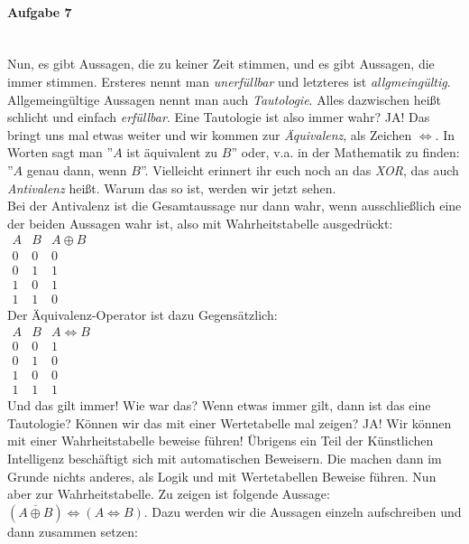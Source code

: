 \documentclass[12pt,a4paper,ngerman]{scrartcl}
\begin{document}
	\paragraph{Aufgabe 7}\mbox{}\\
	Nun, es gibt Aussagen, die zu keiner Zeit stimmen, und es gibt Aussagen, die immer stimmen. Ersteres nennt man \emph{unerfüllbar} und letzteres ist \emph{allgmeingültig}. Allgemeingültige Aussagen nennt man auch \emph{Tautologie}. Alles dazwischen heißt schlicht und einfach \emph{erfüllbar}. Eine Tautologie ist also immer wahr? JA! Das bringt uns mal etwas weiter und wir kommen zur \emph{Äquivalenz}, als Zeichen $\Leftrightarrow$. In Worten sagt man ''$A$ ist äquivalent zu $B$'' oder, v.a. in der Mathematik zu finden: ''$A$ genau dann, wenn $B$''. Vielleicht erinnert ihr euch noch an das \emph{XOR}, das auch \emph{Antivalenz} heißt. Warum das so ist, werden wir jetzt sehen.\\
	Bei der Antivalenz ist die Gesamtaussage nur dann wahr, wenn ausschließlich eine der beiden Aussagen wahr ist, also mit Wahrheitstabelle ausgedrückt:\\
	$\begin{array}{cc|c}
		A & B & A \oplus B\\
		\hline
		0 & 0 & 0\\
		0 & 1 & 1\\
		1 & 0 & 1\\
		1 & 1 & 0
	\end{array}$\\
	Der Äquivalenz-Operator ist dazu Gegensätzlich:\\
	$\begin{array}{cc|c}
		A & B & A \Leftrightarrow B\\
		\hline
		0 & 0 & 1\\
		0 & 1 & 0\\
		1 & 0 & 0\\
		1 & 1 & 1
	\end{array}$\\
	Und das gilt immer! Wie war das? Wenn etwas immer gilt, dann ist das eine Tautologie? Können wir das mit einer Wertetabelle mal zeigen? JA! Wir können mit einer Wahrheitstabelle beweise führen! Übrigens ein Teil der Künstlichen Intelligenz beschäftigt sich mit automatischen Beweisern. Die machen dann im Grunde nichts anderes, als Logik und mit Wertetabellen Beweise führen. Nun aber zur Wahrheitstabelle. Zu zeigen ist folgende Aussage: $(\overline{A \oplus B}) \Leftrightarrow (A \Leftrightarrow B)$. Dazu werden wir die Aussagen einzeln aufschreiben und dann zusammen setzen:\\
\end{document}
